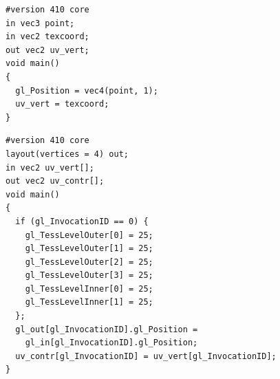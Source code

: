 \documentclass[calcdimensions,landscape,letterpaper]{powersem}
\newcommand{\thecurrentheading}{}
\newcommand{\heading}[1]{\renewcommand{\thecurrentheading}{#1}}
\begin{document}
\begin{slide}
  \heading{Tessellation: Full Pipeline}
  \begin{center}
  \end{center}
\end{slide}

\begin{slide}
    \heading{Tessellation: Vertex Shader}
    \begin{center}
        \begin{minipage}[c]{.5\textwidth}
            \begin{verbatim}
#version 410 core
in vec3 point;
in vec2 texcoord;
out vec2 uv_vert;
void main()
{
  gl_Position = vec4(point, 1);
  uv_vert = texcoord;
}
            \end{verbatim}
        \end{minipage}
    \end{center}
\end{slide}

\begin{slide}
    \heading{Tessellation: Tessellation Control Shader}
    \begin{center}
        \begin{minipage}[c]{.95\textwidth}
            \begin{verbatim}
#version 410 core
layout(vertices = 4) out;
in vec2 uv_vert[];
out vec2 uv_contr[];
void main()
{
  if (gl_InvocationID == 0) {
    gl_TessLevelOuter[0] = 25;
    gl_TessLevelOuter[1] = 25;
    gl_TessLevelOuter[2] = 25;
    gl_TessLevelOuter[3] = 25;
    gl_TessLevelInner[0] = 25;
    gl_TessLevelInner[1] = 25;
  };
  gl_out[gl_InvocationID].gl_Position =
    gl_in[gl_InvocationID].gl_Position;
  uv_contr[gl_InvocationID] = uv_vert[gl_InvocationID];
}
            \end{verbatim}
        \end{minipage}
    \end{center}
\end{slide}
\end{document}

